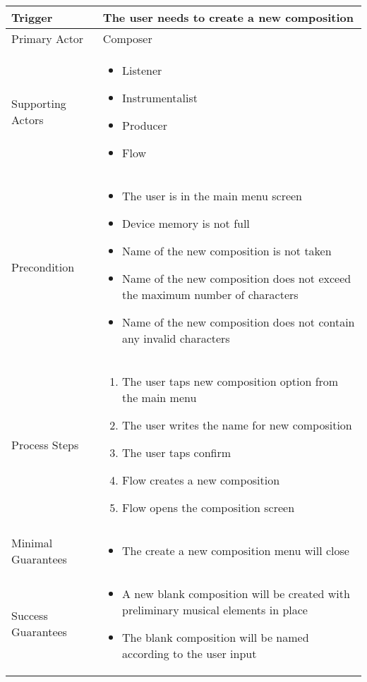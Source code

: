 \begin{longtable}{|X|X|}
\hline
Trigger & 
The user needs to create a new composition \\
\hline
Primary Actor & 
Composer \\
\hline
Supporting Actors & 
\begin{itemize}
\item Listener
\item Instrumentalist
\item Producer
\item Flow
\end{itemize} \\
\hline
Precondition & 
\begin{itemize}
\item The user is in the main menu screen
\item Device memory is not full
\item Name of the new composition is not taken
\item Name of the new composition does not exceed the maximum number of characters
\item Name of the new composition does not contain any invalid characters
\end{itemize} \\
\hline
Process Steps & 
\begin{enumerate}
\item The user taps new composition option from the main menu
\item The user writes the name for new composition
\item The user taps confirm
\item Flow creates a new composition
\item Flow opens the composition screen
\end{enumerate} \\
\hline
Minimal Guarantees & 
\begin{itemize}
	\item The create a new composition menu will close
\end{itemize} \\
\hline
Success Guarantees & 
\begin{itemize}
	\item A new blank composition will be created with preliminary musical elements in place
	\item The blank composition will be named according to the user input
\end{itemize} \\
\hline
\end{longtable}